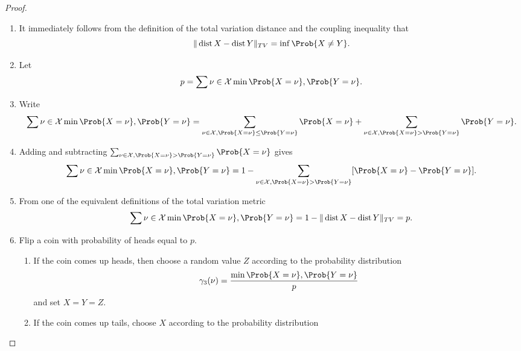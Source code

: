 \documentclass[12pt]{article}
\begin{document}
\begin{proof}
    \begin{enumerate}
        \item
            It immediately follows from the definition of the total
            variation distance and the coupling inequality that
            \[
                \|
                \operatorname{dist}
                {X} -
                \operatorname{dist}
                {Y} \|_{TV} = \inf\Prob{X \ne Y}.
            \]
        \item
            Let
            \[
                p = \sum{\nu \in \mathcal{X}} \min{\Prob{X=\nu}, \Prob{Y=\nu}}.
            \]
        \item
            Write
            \[
                \sum{\nu \in \mathcal{X}} \min{\Prob{X=\nu}, \Prob{Y=\nu}}
                = \sum_{\nu \in \mathcal{X}, \Prob{X=\nu} \le \Prob{Y=\nu}}
                \Prob{X=\nu} + \sum_{\nu \in \mathcal{X}, \Prob{X=\nu} >
                \Prob{Y=\nu}} \Prob{Y=\nu}.
            \]
        \item
            Adding and subtracting \( \sum_{\nu \in \mathcal{X}, \Prob{X=\nu}
            > \Prob{Y=\nu}} \Prob{X=\nu} \) gives
            \[
                \sum{\nu \in \mathcal{X}} \min{\Prob{X=\nu}, \Prob{Y=\nu}}
                = 1 - \sum_{\nu \in \mathcal{X}, \Prob{X=\nu} > \Prob{Y=\nu}}
                [\Prob{X = \nu} - \Prob{Y=\nu}].
            \]
        \item
            From one of the equivalent definitions of the total
            variation metric
            \[
                \sum{\nu \in \mathcal{X}} \min{\Prob{X=\nu}, \Prob{Y=\nu}}
                = 1 - \|
                \operatorname{dist}
                {X} -
                \operatorname{dist}
                {Y} \|_{TV} = p.
            \]
        \item
            Flip a coin with probability of heads equal to \( p \).
            \begin{enumerate}
                \item
                    If the coin comes up heads, then choose a random
                    value \( Z \) according to the probability
                    distribution
                    \[
                        \gamma_{3}(\nu) = \frac{\min{\Prob{X=\nu}, \Prob
                        {Y=\nu}}}{p}
                    \] and set \( X = Y = Z \).
                \item
                    If the coin comes up tails, choose \( X \) according
                    to the probability distribution

\end{enumerate}
\end{enumerate}
\end{proof}
\end{document}
